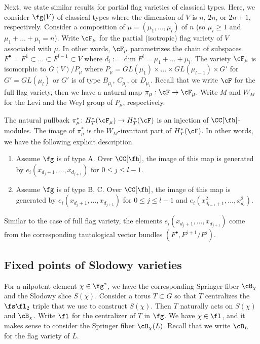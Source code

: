 \documentclass[12pt]{amsart}
\begin{document}
Next, we state similar results for partial flag varieties of classical types. Here, we consider $\fg(V)$ of classical types where the dimension of $V$ is $n$, $2n$, or $2n+1$, respectively. Consider a composition of $\mu= (\mu_1,\ldots,\mu_l)$ of $n$ (so $\mu_i\geqslant 1$ and $\mu_1+\ldots+\mu_l= n$). Write $\cF_\mu$ for the partial (isotropic) flag variety of $V$ associated with $\mu$. In other words, $\cF_\mu$ parametrizes the chain of subspaces $F^\bullet= F^1\subset... \subset F^{l-1}\subset V$ where $d_i:= \dim F^i= \mu_1+...+\mu_i$. The variety $\cF_\mu$ is isomorphic to $G(V)/P_\mu$ where $P_\mu= GL({\mu_1})\times\ldots\times GL({\mu_{l-1}})\times G'$ for $G'= GL(\mu_l)$ or $G'$ is of type $B_{\mu_l}$, $C_{\mu_l}$, or $D_{\mu_l}$. Recall that we write $\cF$ for the full flag variety, then we have a natural map $\pi_\mu: \cF\rightarrow \cF_\mu$. Write $M$ and $W_{M}$ for the Levi and the Weyl group of $P_\mu$, respectively.

\begin{prop}\cite[Corollary 4.5.4]{Anderson2023EquivariantCI} \label{cohomology of partial flag}
    The natural pullback $\pi_{\mu}^{*}\colon H^{*}_{T}(\cF_\mu)\rightarrow H^{*}_{T}(\cF)$ is an injection of $\CC[\fh]$-modules. The image of $\pi_{\mu}^{*}$ is the $W_{M}$-invariant part of $H^{*}_{T}(\cF)$. In other words, we have the following explicit description.
    \begin{enumerate}
        \item Assume $\fg$ is of type A. Over $\CC[\fh]$, the image of this map is generated by $e_i(x_{{d_j}+1},\ldots, x_{d_{j+1}})$ for $0\leqslant j\leqslant l-1$.
        \item Assume $\fg$ is of type B, C. Over $\CC[\fh]$, the image of this map is generated by $e_i(x_{{d_j}+1},\ldots, x_{d_{j+1}})$ for $0\leqslant j\leqslant l-1$ and $e_i(x^{2}_{{d_{l-1}}+1},\ldots, x^{2}_{d_{l}})$.
    \end{enumerate}

\end{prop}
Similar to the case of full flag variety, the elements $e_i(x_{{d_j}+1},..., x_{d_{j+1}})$ come from the corresponding tautological vector bundles $(F^\bullet, F^{j+1}/F^{j})$.





\subsection{Fixed points of Slodowy varieties} For a nilpotent element $\chi\in \fg^*$, we have the corresponding Springer fiber $\cB_\chi$ and the Slodowy slice $S(\chi)$. Consider a torus $T\subset G$ so that $T$ centralizes the $\fs\fl_2$ triple that we use to construct $S(\chi)$. Then $T$ naturally acts on $S(\chi)$ and $\cB_\chi$. Write $\fl$ for the centralizer of $T$ in $\fg$. We have $\chi\in \fl$, and it makes sense to consider the Springer fiber $\cB_\chi(L)$. Recall that we write $\cB_L$ for the flag variety of $L$.
\end{document}
